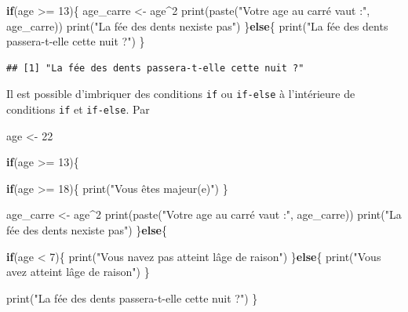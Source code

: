 \documentclass[
  11pt,
]{book}
\newenvironment{Shaded}{\begin{snugshade}}{\end{snugshade}}
\newcommand{\ControlFlowTok}[1]{\textcolor[rgb]{0.13,0.29,0.53}{\textbf{#1}}}
\newcommand{\DecValTok}[1]{\textcolor[rgb]{0.00,0.00,0.81}{#1}}
\newcommand{\FunctionTok}[1]{\textcolor[rgb]{0.00,0.00,0.00}{#1}}
\newcommand{\NormalTok}[1]{#1}
\newcommand{\OtherTok}[1]{\textcolor[rgb]{0.56,0.35,0.01}{#1}}
\newcommand{\SpecialCharTok}[1]{\textcolor[rgb]{0.00,0.00,0.00}{#1}}
\newcommand{\StringTok}[1]{\textcolor[rgb]{0.31,0.60,0.02}{#1}}
\numberwithin{equation}{section}
\numberwithin{countremarque}{section}
\begin{document}
\begin{Shaded}
\begin{Highlighting}[]
\ControlFlowTok{if}\NormalTok{(age }\SpecialCharTok{\textgreater{}=} \DecValTok{13}\NormalTok{)\{}
\NormalTok{  age\_carre }\OtherTok{\textless{}{-}}\NormalTok{ age}\SpecialCharTok{\^{}}\DecValTok{2}
  \FunctionTok{print}\NormalTok{(}\FunctionTok{paste}\NormalTok{(}\StringTok{"Votre age au carré vaut :"}\NormalTok{, age\_carre))}
  \FunctionTok{print}\NormalTok{(}\StringTok{"La fée des dents n\textquotesingle{}existe pas"}\NormalTok{)}
\NormalTok{\}}\ControlFlowTok{else}\NormalTok{\{}
  \FunctionTok{print}\NormalTok{(}\StringTok{"La fée des dents passera{-}t{-}elle cette nuit ?"}\NormalTok{)}
\NormalTok{\}}
\end{Highlighting}
\end{Shaded}

\begin{lstlisting}
## [1] "La fée des dents passera-t-elle cette nuit ?"
\end{lstlisting}

Il est possible d'imbriquer des conditions \texttt{if} ou \texttt{if-else} à l'intérieure de conditions \texttt{if} et \texttt{if-else}. Par

\begin{Shaded}
\begin{Highlighting}[]
\NormalTok{age }\OtherTok{\textless{}{-}} \DecValTok{22}

\ControlFlowTok{if}\NormalTok{(age }\SpecialCharTok{\textgreater{}=} \DecValTok{13}\NormalTok{)\{}
  
  \ControlFlowTok{if}\NormalTok{(age }\SpecialCharTok{\textgreater{}=} \DecValTok{18}\NormalTok{)\{}
    \FunctionTok{print}\NormalTok{(}\StringTok{"Vous êtes majeur(e)"}\NormalTok{)}
\NormalTok{  \}}
  
\NormalTok{  age\_carre }\OtherTok{\textless{}{-}}\NormalTok{ age}\SpecialCharTok{\^{}}\DecValTok{2}
  \FunctionTok{print}\NormalTok{(}\FunctionTok{paste}\NormalTok{(}\StringTok{"Votre age au carré vaut :"}\NormalTok{, age\_carre))}
  \FunctionTok{print}\NormalTok{(}\StringTok{"La fée des dents n\textquotesingle{}existe pas"}\NormalTok{)}
\NormalTok{\}}\ControlFlowTok{else}\NormalTok{\{}
  
  \ControlFlowTok{if}\NormalTok{(age }\SpecialCharTok{\textless{}} \DecValTok{7}\NormalTok{)\{}
    \FunctionTok{print}\NormalTok{(}\StringTok{"Vous n\textquotesingle{}avez pas atteint l\textquotesingle{}âge de raison"}\NormalTok{)}
\NormalTok{  \}}\ControlFlowTok{else}\NormalTok{\{}
    \FunctionTok{print}\NormalTok{(}\StringTok{"Vous avez atteint l\textquotesingle{}âge de raison"}\NormalTok{)}
\NormalTok{  \}}
  
  \FunctionTok{print}\NormalTok{(}\StringTok{"La fée des dents passera{-}t{-}elle cette nuit ?"}\NormalTok{)}
\NormalTok{\}}
\end{Highlighting}
\end{Shaded}
\end{document}
